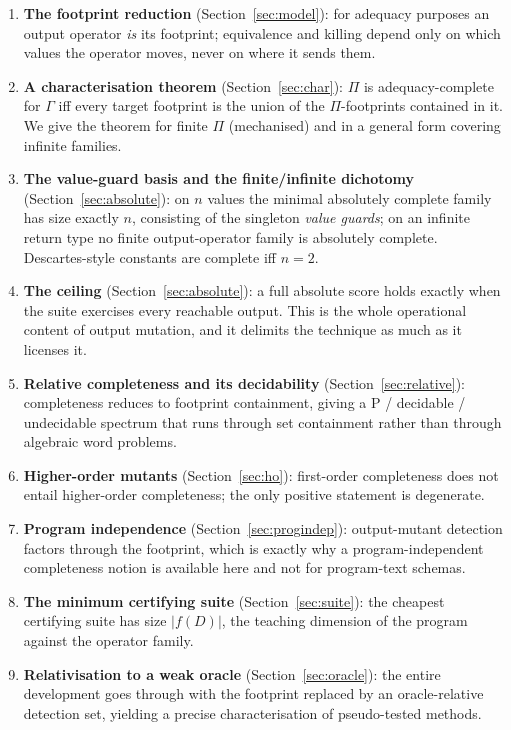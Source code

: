 \documentclass[runningheads,envcountsect,envcountsame]{llncs}
\begin{document}
\begin{enumerate}
\item \textbf{The footprint reduction} (Section~\ref{sec:model}): for adequacy
purposes an output operator \emph{is} its footprint; equivalence and killing
depend only on which values the operator moves, never on where it sends them.

\item \textbf{A characterisation theorem} (Section~\ref{sec:char}): $\Pi$ is
adequacy-complete for $\Gamma$ iff every target footprint is the union of the
$\Pi$-footprints contained in it. We give the theorem for finite $\Pi$
(mechanised) and in a general form covering infinite families.

\item \textbf{The value-guard basis and the finite/infinite dichotomy}
(Section~\ref{sec:absolute}): on $n$ values the minimal absolutely complete family
has size exactly $n$, consisting of the singleton \emph{value guards}; on an
infinite return type no finite output-operator family is absolutely complete.
Descartes-style constants are complete iff $n = 2$.

\item \textbf{The ceiling} (Section~\ref{sec:absolute}): a full absolute score
holds exactly when the suite exercises every reachable output. This is the whole
operational content of output mutation, and it delimits the technique as much as
it licenses it.

\item \textbf{Relative completeness and its decidability}
(Section~\ref{sec:relative}): completeness reduces to footprint containment,
giving a P / decidable / undecidable spectrum that runs through set containment
rather than through algebraic word problems.

\item \textbf{Higher-order mutants} (Section~\ref{sec:ho}): first-order
completeness does not entail higher-order completeness; the only positive
statement is degenerate.

\item \textbf{Program independence} (Section~\ref{sec:progindep}):
output-mutant detection factors through the footprint, which is exactly why a
program-independent completeness notion is available here and not for
program-text schemas.

\item \textbf{The minimum certifying suite} (Section~\ref{sec:suite}): the
cheapest certifying suite has size $|f(D)|$, the teaching dimension of the
program against the operator family.

\item \textbf{Relativisation to a weak oracle} (Section~\ref{sec:oracle}): the
entire development goes through with the footprint replaced by an
oracle-relative detection set, yielding a precise characterisation of
pseudo-tested methods.
\end{enumerate}
\end{document}
